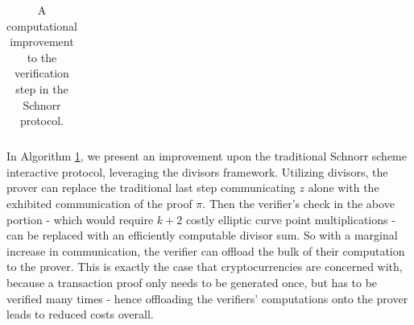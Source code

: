 \documentclass[11pt,letterpaper]{article}
\theoremstyle{definition}
\newcommand{\6}{\mathbf}
\newcommand{\7}{\mathcal}
\newcommand{\lsamp}{\xleftarrow{\$}}
\begin{document}
\begin{table}[H]
\begin{tabular}{|lcl|}






    \hline
    \end{tabular}    
    \caption{A computational improvement to the verification step in the Schnorr protocol.}
    \label{alg:SchnorrDivisors}
\end{table}








In Algorithm \ref{alg:SchnorrDivisors}, we present an improvement upon the traditional Schnorr scheme interactive protocol, leveraging the divisors framework. 
Utilizing divisors, the prover can replace the traditional last step communicating $z$ alone with the exhibited communication of the proof $\pi$.
Then the verifier's check in the above portion - which would require $k+2$ costly elliptic curve point multiplications - can be replaced with an efficiently computable divisor sum. 
So with a marginal increase in communication, the verifier can offload the bulk of their computation to the prover.
This is exactly the case that cryptocurrencies are concerned with, because a transaction proof only needs to be generated once, but has to be verified many times - hence offloading the verifiers' computations onto the prover leads to reduced costs overall.
\end{document}
